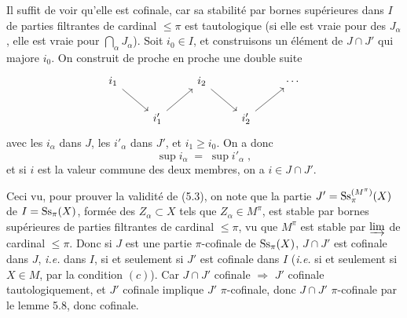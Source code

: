 Il suffit de voir qu'elle est cofinale, car sa stabilité par bornes supérieures dans $I$ de parties filtrantes de cardinal $\leq \pi$ est tautologique (si elle est vraie pour des $J_\alpha$, elle est vraie pour $\bigcap_\alpha J_\alpha$). Soit $i_0 \in I$, et construisons un élément de $J \cap J'$ qui majore $i_0$. On construit de proche en proche une double suite
\[
\begin{tikzcd}
i_1 \arrow[dr] & & i_2 \arrow[dr] & & \cdots \\
& i'_1 \arrow[ur] & & i'_2 \arrow[ur] &
\end{tikzcd}
\]
avec les $i_\alpha$ dans $J$, les $i'_\alpha$ dans $J'$, et $i_1 \geq i_0$. On a donc
\[
\sup i_\alpha \;=\; \sup i'_\alpha \;,
\]
et si $i$ est la valeur commune des deux membres, on a $i \in J \cap J'$.

Ceci vu, pour prouver la validité de (5.3), on note que la partie $J' = \mathrm{Ss}_\pi^{(M^\pi)}(X)$ de $I = \mathrm{Ss}_\pi(X)$, formée des $Z_\alpha \subset X$ tels que $Z_\alpha \in M^\pi$, est stable par bornes supérieures de parties filtrantes de cardinal $\leq \pi$, vu que $M^\pi$ est stable
par $\varinjlim$ de cardinal $\leq \pi$. Donc si $J$ est une partie $\pi$-cofinale de $\mathrm{Ss}_\pi(X)$, $J \cap J'$ est cofinale dans $J$, \textit{i.e.} dans $I$, si et seulement si $J'$ est cofinale dans $I$ (\textit{i.e.} si et seulement si $X \in M$, par la condition $(c)$). Car $J \cap J'$ cofinale $\Longrightarrow$ $J'$ cofinale tautologiquement, et $J'$ cofinale implique $J'$ $\pi$-cofinale, donc $J \cap J'$ $\pi$-cofinale par le lemme 5.8, donc cofinale.

